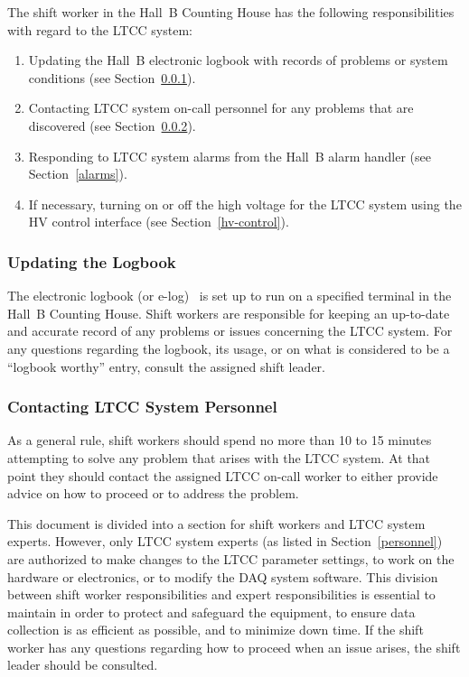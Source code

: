 \documentclass{article}
\begin{document}
The shift worker in the Hall~B Counting House has the following responsibilities with regard to the LTCC
system:

\begin{enumerate}
\item Updating the Hall~B electronic logbook with records of problems or system conditions (see 
Section~\ref{logbook}).

\item Contacting LTCC system on-call personnel for any problems that are discovered (see 
Section~\ref{contact}).

\item Responding to LTCC system alarms from the Hall~B alarm handler (see Section~\ref{alarms}).

\item If necessary, turning on or off the high voltage for the LTCC system using the HV control interface (see 
Section~\ref{hv-control}).

\end{enumerate}

\subsubsection{Updating the Logbook}
\label{logbook}

The electronic logbook (or e-log)~\cite{e-log} is set up to run on a specified terminal in the 
Hall~B Counting House. Shift workers are responsible for keeping an up-to-date and accurate record
of any problems or issues concerning the LTCC system. For any questions regarding the logbook, its
usage, or on what is considered to be a ``logbook worthy'' entry, consult the assigned shift leader.

\subsubsection{Contacting LTCC System Personnel}
\label{contact}

As a general rule, shift workers should spend no more than 10 to 15 minutes attempting to solve
any problem that arises with the LTCC system. At that point they should contact the assigned 
LTCC on-call worker to either provide advice on how to proceed or to address the problem.

This document is divided into a section for shift workers and LTCC system experts. However, only 
LTCC system experts (as listed in Section~\ref{personnel}) are authorized to make changes to the 
LTCC parameter settings, to work on the hardware or electronics, or to modify the DAQ system 
software. This division between shift worker responsibilities and expert responsibilities is
essential to maintain in order to protect and safeguard the equipment, to ensure data collection
is as efficient as possible, and to minimize down time. If the shift worker has any questions 
regarding how to proceed when an issue arises, the shift leader should be consulted.
\end{document}
